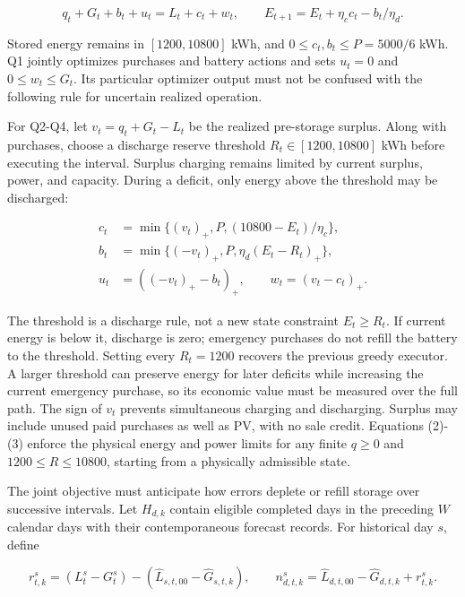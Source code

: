\[
q_t+G_t+b_t+u_t=L_t+c_t+w_t,\qquad
E_{t+1}=E_t+\eta_c c_t-b_t/\eta_d. \tag{2}
\]

Stored energy remains in \([1200,10800]\) kWh, and \(0\le c_t,b_t\le P=5000/6\) kWh. Q1 jointly optimizes purchases and battery actions and sets \(u_t=0\) and \(0\le w_t\le G_t\). Its particular optimizer output must not be confused with the following rule for uncertain realized operation.


For Q2-Q4, let \(v_t=q_t+G_t-L_t\) be the realized pre-storage surplus. Along with purchases, choose a discharge reserve threshold \(R_t\in[1200,10800]\) kWh before executing the interval. Surplus charging remains limited by current surplus, power, and capacity. During a deficit, only energy above the threshold may be discharged:

\[
\begin{aligned}
c_t&=\min\{(v_t)_+,P,(10800-E_t)/\eta_c\},\\
b_t&=\min\{(-v_t)_+,P,\eta_d(E_t-R_t)_+\},\\
u_t&=((-v_t)_+-b_t)_+,\qquad w_t=(v_t-c_t)_+.
\end{aligned} \tag{3}
\]

The threshold is a discharge rule, not a new state constraint \(E_t\ge R_t\). If current energy is below it, discharge is zero; emergency purchases do not refill the battery to the threshold. Setting every \(R_t=1200\) recovers the previous greedy executor. A larger threshold can preserve energy for later deficits while increasing the current emergency purchase, so its economic value must be measured over the full path. The sign of \(v_t\) prevents simultaneous charging and discharging. Surplus may include unused paid purchases as well as PV, with no sale credit. Equations (2)-(3) enforce the physical energy and power limits for any finite \(q\ge0\) and \(1200\le R\le10800\), starting from a physically admissible state.


The joint objective must anticipate how errors deplete or refill storage over successive intervals. Let \(H_{d,k}\) contain eligible completed days in the preceding \(W\) calendar days with their contemporaneous forecast records. For historical day \(s\), define

\[
r^s_{t,k}=(L_t^s-G_t^s)
 -(\widehat L_{s,t,00}-\widehat G_{s,t,k}),\qquad
n^s_{d,t,k}=\widehat L_{d,t,00}-\widehat G_{d,t,k}+r^s_{t,k}. \tag{4}
\]

